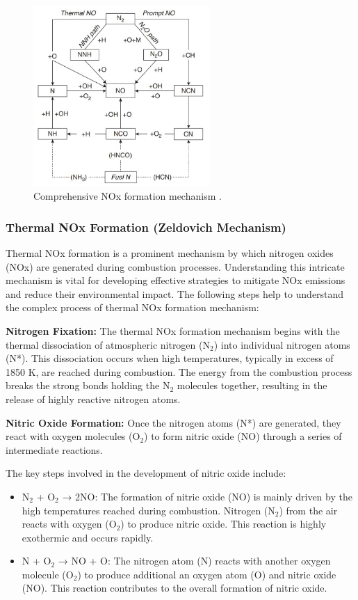 \begin{figure}[h]
	\centering
	\includegraphics[width=0.6\textwidth]{Chapter1/Images/NoxMechanism.jpeg}
	\caption[Comprehensive NOx formation mechanism]{Comprehensive NOx formation mechanism \cite{LTY2013}.}
	\label{NoxMechanism}
\end{figure}

\subsubsection{Thermal NOx Formation (Zeldovich Mechanism)}
Thermal NOx formation is a prominent mechanism by which nitrogen oxides (NOx) are generated during combustion processes. Understanding this intricate mechanism is vital for developing effective strategies to mitigate NOx emissions and reduce their environmental impact. The following steps help to understand the complex process of thermal NOx formation mechanism:

\textbf{Nitrogen Fixation:}
The thermal NOx formation mechanism begins with the thermal dissociation of atmospheric nitrogen (N$_2$) into individual nitrogen atoms (N*). This dissociation occurs when high temperatures, typically in excess of 1850 K, are reached during combustion. The energy from the combustion process breaks the strong bonds holding the N$_2$ molecules together, resulting in the release of highly reactive nitrogen atoms.

\textbf{Nitric Oxide Formation:}
Once the nitrogen atoms (N*) are generated, they react with oxygen molecules (O$_2$) to form nitric oxide (NO) through a series of intermediate reactions. 

The key steps involved in the development of nitric oxide include:
\begin{itemize}
    \item N$_2$ + O$_2$ → 2NO: The formation of nitric oxide (NO) is mainly driven by the high temperatures reached during combustion. Nitrogen (N$_2$) from the air reacts with oxygen (O$_2$) to produce nitric oxide. This reaction is highly exothermic and occurs rapidly.
    \item N + O$_2$ → NO + O: The nitrogen atom (N) reacts with another oxygen molecule (O$_2$) to produce additional an oxygen atom (O) and nitric oxide (NO). This reaction contributes to the overall formation of nitric oxide.
\end{itemize}

